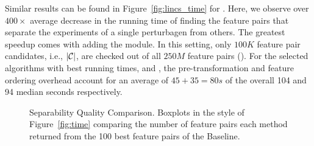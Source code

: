 Similar results can be found in Figure~\ref{fig:lincs_time} for \lincs. Here, we observe over $400\times$ average decrease in the running time of finding the \topk feature pairs that separate the \lincs experiments of a single perturbagen from others. The greatest speedup comes with adding the \sampling module. In this setting, only $100K$ feature pair candidates, i.e., $|{\mathcal{C}}|$, are checked out of all $250M$ feature pairs (\timetbl). For the selected algorithms with best running times, \horiz and \vertic, the pre-transformation and feature ordering overhead account for an average of $45+35=80s$ of the overall 104 and 94 median seconds respectively.



\begin{figure}[h]
\centering %
\vspace{-2mm}
\vspace{-5mm}
\caption{Separability Quality Comparison. Boxplots in the style of Figure~\ref{fig:time} comparing the number of feature pairs each method returned from the 100 best feature pairs of the Baseline.}
\vspace{-5mm}
\label{fig:separability}
\end{figure}

